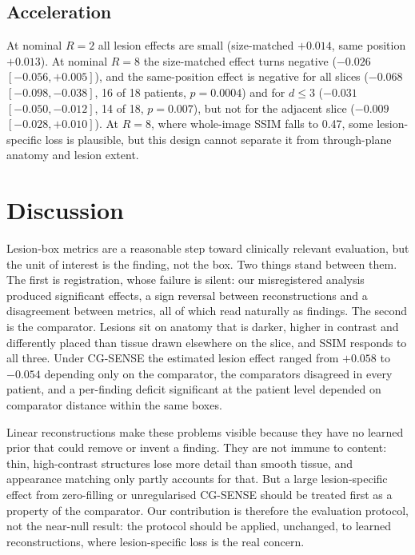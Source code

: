 \documentclass[letterpaper]{article} %
\begin{document}
\subsection{Acceleration}

At nominal $R=2$ all lesion effects are small (size-matched $+0.014$, same
position $+0.013$). At nominal $R=8$ the size-matched effect turns negative
($-0.026$ $[-0.056, +0.005]$), and the same-position effect is negative for
all slices ($-0.068$ $[-0.098, -0.038]$, 16 of 18 patients, $p=0.0004$) and
for $d\le3$ ($-0.031$ $[-0.050, -0.012]$, 14 of 18, $p=0.007$), but not for
the adjacent slice ($-0.009$ $[-0.028, +0.010]$). At $R=8$, where whole-image
SSIM falls to 0.47, some lesion-specific loss is plausible, but this design
cannot separate it from through-plane anatomy and lesion extent.

\section{Discussion}

Lesion-box metrics are a reasonable step toward clinically relevant
evaluation, but the unit of interest is the finding, not the box. Two things
stand between them. The first is registration, whose failure is silent: our
misregistered analysis produced significant effects, a sign reversal between
reconstructions and a disagreement between metrics, all of which read
naturally as findings. The second is the comparator. Lesions sit on anatomy
that is darker, higher in contrast and differently placed than tissue drawn
elsewhere on the slice, and SSIM responds to all three. Under CG-SENSE the
estimated lesion effect ranged from $+0.058$ to $-0.054$ depending only on the
comparator, the comparators disagreed in every patient, and a per-finding
deficit significant at the patient level depended on comparator distance
within the same boxes.

Linear reconstructions make these problems visible because they have no
learned prior that could remove or invent a finding. They are not immune to
content: thin, high-contrast structures lose more detail than smooth tissue,
and appearance matching only partly accounts for that. But a large
lesion-specific effect from zero-filling or unregularised CG-SENSE should be
treated first as a property of the comparator. Our contribution is therefore
the evaluation protocol, not the near-null result: the protocol should be
applied, unchanged, to learned reconstructions, where lesion-specific loss is
the real concern.
\end{document}
